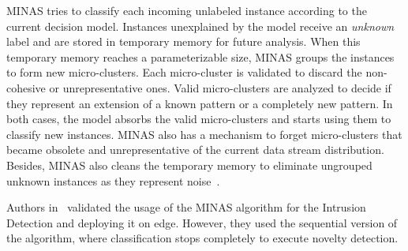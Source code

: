 MINAS tries to classify each incoming unlabeled instance according to the current decision model. Instances unexplained by the model 
receive an \textit{unknown} label and are stored in temporary memory for future analysis. When this temporary memory reaches a parameterizable size, MINAS groups the instances to form new micro-clusters. Each micro-cluster is validated to discard the non-cohesive or unrepresentative ones. Valid micro-clusters are analyzed to decide if they represent an extension of a known pattern or a completely new pattern. In both cases, the model absorbs the valid micro-clusters and starts using them to classify new instances.
MINAS also has a mechanism to forget micro-clusters that became obsolete and unrepresentative of the current data stream distribution. 
Besides, MINAS also cleans the temporary memory to eliminate ungrouped unknown instances as they represent noise~\cite{Faria2016minas}.

Authors in~\cite{Cassales2019a} validated the usage of the MINAS algorithm for the Intrusion Detection and deploying it on edge. However, they used the sequential version of the algorithm, where classification stops completely to execute novelty detection.


